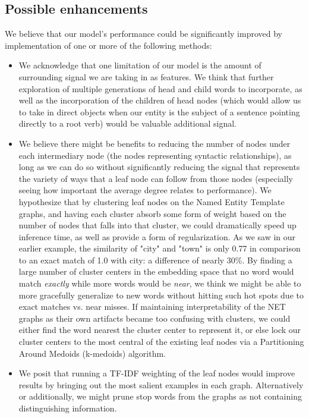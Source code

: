 \documentclass[11pt,a4paper]{article}
\begin{document}
\subsection{Possible enhancements} \label{enhancements}

We believe that our model's performance could be significantly improved by implementation of one or more of the following methods:

\begin{itemize}

\item We acknowledge that one limitation of our model is the amount of surrounding signal we are taking in as features. We think that further exploration of multiple generations of head and child words to incorporate, as well as the incorporation of the children of head nodes (which would allow us to take in direct objects when our entity is the subject of a sentence pointing directly to a root verb) would be valuable additional signal.

\item We believe there might be benefits to reducing the number of nodes under each intermediary node (the nodes representing syntactic relationships), as long as we can do so without significantly reducing the signal that represents the variety of ways that a leaf node can follow from those nodes (especially seeing how important the average degree relates to performance). We hypothesize that by clustering leaf nodes on the Named Entity Template graphs, and having each cluster absorb some form of weight based on the number of nodes that falls into that cluster, we could dramatically speed up inference time, as well as provide a form of regularization. As we saw in our earlier example, the similarity of "city" and "town" is only 0.77 in comparison to an exact match of 1.0 with city: a difference of nearly 30\%. By finding a large number of cluster centers in the embedding space that no word would match \textit{exactly} while more words would be \textit{near}, we think we might be able to more gracefully generalize to new words without hitting such hot spots due to exact matches vs. near misses. If maintaining interpretability of the NET graphs as their own artifacts became too confusing with clusters, we could either find the word nearest the cluster center to represent it, or else lock our cluster centers to the most central of the existing leaf nodes via a Partitioning Around Medoids (k-medoids) algorithm.

\item We posit that running a TF-IDF weighting of the leaf nodes would improve results by bringing out the most salient examples in each graph. Alternatively or additionally, we might prune stop words from the graphs as not containing distinguishing information.


\end{itemize}
\end{document}
